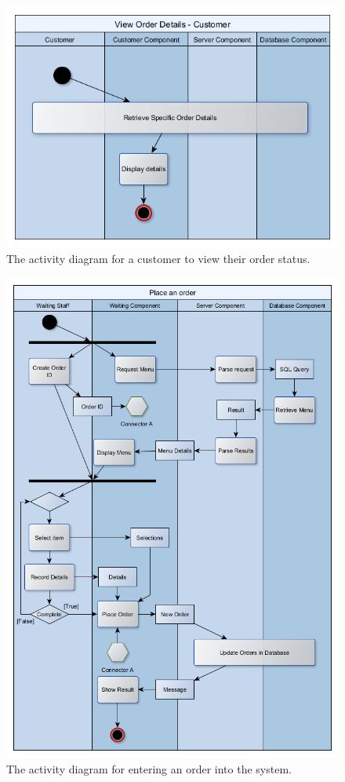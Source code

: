 \documentclass[11pt, a4paper]{report}
\begin{document}
\begin{figure}[H]
\centering
\includegraphics[scale=0.75]{Figures/CustomerViewDetails.png}
\caption{The activity diagram for a customer to view their order status.}
\end{figure}

\begin{figure}[H]
\centering
\includegraphics[scale=0.55]{Figures/PlaceOrder.png}
\caption{The activity diagram for entering an order into the system.}
\end{figure}
\end{document}
